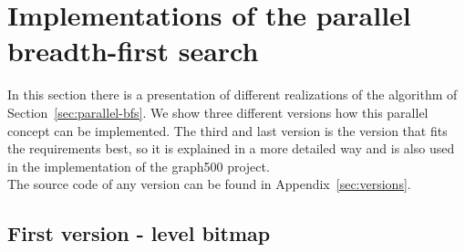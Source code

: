 \documentclass[12pt,a4paper]{article}
\begin{document}
\section{Implementations of the parallel breadth-first search}
\label{sec:implementations}

In this section there is a presentation of different realizations of the algorithm of Section~\ref{sec:parallel-bfs}. We show three different versions how this parallel concept can be implemented. The third and last version is the version that fits the requirements best, so it is explained in a more detailed way and is also used in the implementation of the graph500 project.\\
The source code of any version can be found in Appendix~\ref{sec:versions}.

\subsection{First version - level bitmap}
\label{sec:firstversion}
\end{document}
